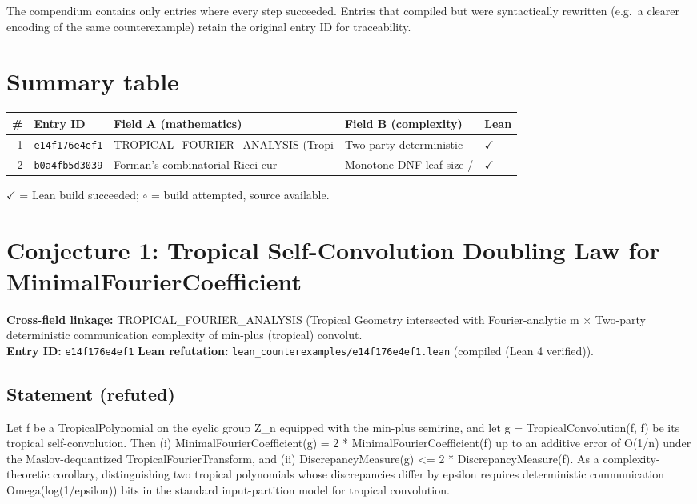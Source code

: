 \documentclass[11pt,a4paper]{article}
\begin{document}
The compendium contains only entries where every step succeeded. Entries
that compiled but were syntactically rewritten (e.g.\ a clearer encoding
of the same counterexample) retain the original entry ID for traceability.


\section{Summary table}
\begin{center}
\begin{tabular}{rllll}
\toprule
\# & Entry ID & Field A (mathematics) & Field B (complexity) & Lean \\
\midrule
1 & \texttt{e14f176e4ef1} & TROPICAL\_FOURIER\_ANALYSIS (Tropi & Two-party deterministic  & $\checkmark$ \\
2 & \texttt{b0a4fb5d3039} & Forman's combinatorial Ricci cur & Monotone DNF leaf size / & $\checkmark$ \\
\bottomrule
\end{tabular}
\end{center}
$\checkmark$ = Lean build succeeded; $\circ$ = build attempted, source available.


\section{Conjecture 1: Tropical Self-Convolution Doubling Law for MinimalFourierCoefficient}
\textbf{Cross-field linkage:} TROPICAL\_FOURIER\_ANALYSIS (Tropical Geometry intersected with Fourier-analytic m $\times$ Two-party deterministic communication complexity of min-plus (tropical) convolut.\\
\textbf{Entry ID:} \texttt{e14f176e4ef1}\quad
\textbf{Lean refutation:} \texttt{lean\_counterexamples/e14f176e4ef1.lean} (compiled (Lean 4 verified)).

\subsection*{Statement (refuted)}
Let f be a TropicalPolynomial on the cyclic group Z\_n equipped with the min-plus semiring, and let g = TropicalConvolution(f, f) be its tropical self-convolution. Then (i) MinimalFourierCoefficient(g) = 2 * MinimalFourierCoefficient(f) up to an additive error of O(1/n) under the Maslov-dequantized TropicalFourierTransform, and (ii) DiscrepancyMeasure(g) <= 2 * DiscrepancyMeasure(f). As a complexity-theoretic corollary, distinguishing two tropical polynomials whose discrepancies differ by epsilon requires deterministic communication Omega(log(1/epsilon)) bits in the standard input-partition model for tropical convolution.
\end{document}
